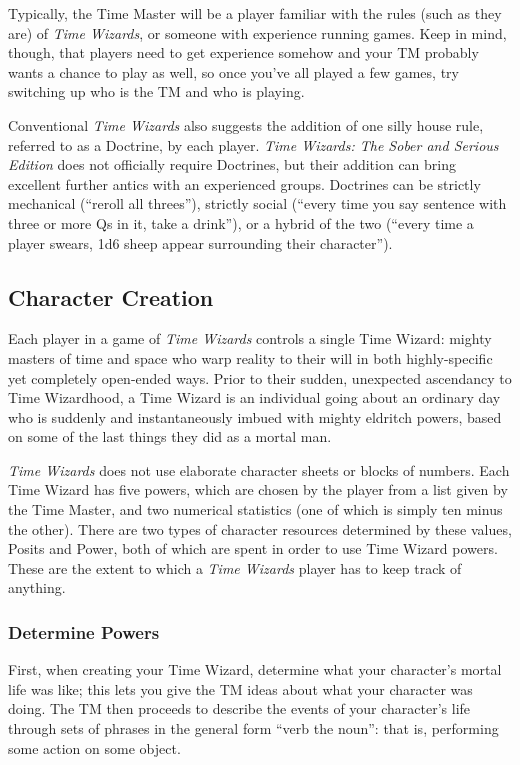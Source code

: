 \documentclass[twoside]{article}
\newcommand{\twsse}{\emph{Time Wizards: The Sober and Serious Edition}}
\newcommand{\tw}{\emph{Time Wizards}}
\begin{document}
Typically, the Time Master will be a player familiar with the rules (such as they are) of \tw{},
or someone with experience running games. Keep in mind, though, that players need to get
experience somehow and your TM probably wants a chance to play as well, so once you've all played
a few games, try switching up who is the TM and who is playing.

Conventional \tw{} also suggests the addition of one silly house rule, referred to as a Doctrine,
by each player. \twsse{} does not officially require Doctrines, but their addition can bring
excellent further antics with an experienced groups. Doctrines can be strictly mechanical
(``reroll all threes''), strictly social (``every time you say sentence with three or more Qs
in it, take a drink''), or a hybrid of the two (``every time a player swears, 1d6 sheep appear
surrounding their character'').

\subsection{Character Creation} \label{ssec:creation}
Each player in a game of \tw{} controls a single Time Wizard: mighty masters of time and space
who warp reality to their will in both highly-specific yet completely open-ended ways. Prior to
their sudden, unexpected ascendancy to Time Wizardhood, a Time Wizard is an individual going
about an ordinary day who is suddenly and instantaneously imbued with mighty eldritch powers,
based on some of the last things they did as a mortal man.

\tw{} does not use elaborate character sheets or blocks of numbers. Each Time Wizard has five
powers, which are chosen by the player from a list given by the Time Master, and two numerical
statistics (one of which is simply ten minus the other). There are two types of character
resources determined by these values, Posits and Power, both of which are spent in order to use
Time Wizard powers. These are the extent to which a \tw{} player has to keep track of anything.

\subsubsection{Determine Powers} \label{ssec:get-powers}
First, when creating your Time Wizard, determine what your character's mortal life was like;
this lets you give the TM ideas about what your character was doing. The TM then proceeds to
describe the events of your character's life through sets of phrases in the general form
``verb the noun'': that is, performing some action on some object.
\end{document}
